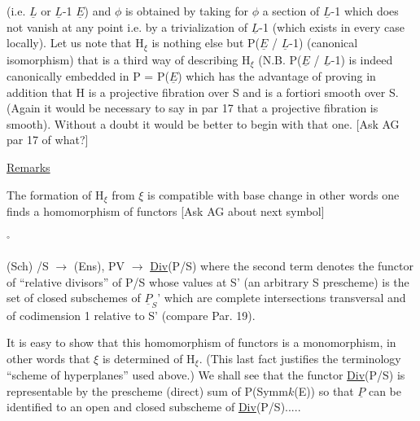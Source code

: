 
(i.e. $\underline{L}$ or $\underline{L}$-1 \hand{$\subset$} $\underline{E}$) and $\phi$ is obtained by taking for $\phi$ a
section of $\underline{L}$-1 which does not vanish at any point i.e. by a
trivialization of $\underline{L}$-1 (which exists in every case locally). Let us
note that H$_{\xi}$ is nothing else but P($\underline{E}$ / $\underline{L}$-1) (canonical isomorphism)
that is a third way of describing H$_{\xi}$ (N.B. P($\underline{E}$ / $\underline{L}$-1) is indeed
canonically embedded in P = P($\underline{E}$) which has the advantage of
proving in addition that H is a projective fibration over S and is
a fortiori smooth over S. (Again it would be necessary to say in
par 17 that a projective fibration is smooth). Without a doubt it
would be better to begin with that one. [Ask AG par 17 of what?]

\uline{Remarks}

The formation of H$_{\xi}$ from $\xi$ is compatible with base change in
other words one finds a homomorphism of functors [Ask AG about
next symbol]

\quad $^{\circ}$

(Sch) /S $\rightarrow$ (Ens), PV $\rightarrow$ \uline{Div}(P/S) where the second term denotes the
functor of ``relative divisors'' of P/S whose values at S' (an
arbitrary S prescheme) is the set of closed subschemes of $\underline{P}_{S}$' which
are complete intersections transversal and of codimension 1
relative to S' (compare Par. 19).

It is easy to show that this homomorphism of functors is a
monomorphism, in other words that $\xi$ is determined of H$_{\xi}$. (This
last fact justifies the terminology ``scheme of hyperplanes'' used
above.) We shall see that the functor \uline{Div}(P/S) is representable
by the prescheme (direct) sum of P(Symm$k$(E)) so that $\underline{P}$ can be
identified to an open and closed subscheme of \uline{Div}(P/S).....
